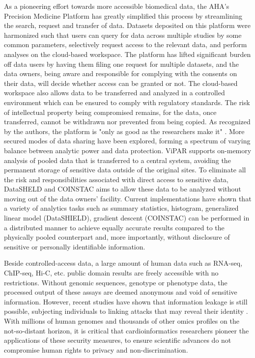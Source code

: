 \documentclass[letter]{bioinfo}
\begin{document}
	As a pioneering effort towards more accessible biomedical data, the AHA's Precision Medicine Platform \citep{Kass-Hout:2018:American} has greatly simplified this process by streamlining the search, request and transfer of data. Datasets deposited on this platform were harmonized such that users can query for data across multiple studies by some common parameters, selectively request access to the relevant data, and perform analyses on the cloud-based workspace. The platform has lifted significant burden off data users by having them filing one request for multiple datasets, and the data owners, being aware and responsible for complying with the consents on their data, will decide whether access can be granted or not. The cloud-based workspace also allows data to be transferred and analyzed in a controlled environment which can be ensured to comply with regulatory standards. The risk of intellectual property being compromised remains, for the data, once transferred, cannot be withdrawn nor prevented from being copied. As recognized by the authors, the platform is "only as good as the researchers make it" \citep{Kass-Hout:2018:American}.
	More secured modes of data sharing have been explored, forming a spectrum of varying balance between analytic power and data protection. ViPAR \citep{Carter:2016:ViPAR} supports on-memory analysis of pooled data that is transferred to a central system, avoiding the permanent storage of sensitive data outside of the original sites. To eliminate all the risk and responsibilities associated with direct access to sensitive data, DataSHELD  \citep{Gaye:2014:DataSHIELD, Wilson:2017:DataSHIELD} and COINSTAC \citep{Plis:2016:COINSTAC} aims to allow these data to be analyzed without moving out of the data owners' facility. Current implementations have shown that a variety of analytics tasks such as summary statistics, histogram, generalized linear model (DataSHIELD), gradient descent (COINSTAC) can be performed in a distributed manner to achieve equally accurate results compared to the physically pooled counterpart and, more importantly, without disclosure of sensitive or personally identifiable information.
	
	Beside controlled-access data, a large amount of human data such as RNA-seq, ChIP-seq, Hi-C, etc. public domain results are freely accessible with no restrictions. Without genomic sequences, genotype or phenotype data, the processed output of these assays are deemed anonymous and void of sensitive information. However, recent studies have shown that information leakage is still possible, subjecting individuals to linking attacks that may reveal their identity \citep{Harmanci:2016:Quantification, Harmanci:2018:Analysis}.  With millions of human genomes and thousands of other omics profiles on the not-so-distant horizon, it is critical that cardioinformatics researchers pioneer the applications of these security measures, to ensure scientific advances do not compromise human rights to privacy and non-discrimination.
	
\end{document}
